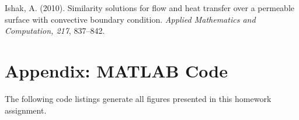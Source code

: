 \documentclass[12pt]{article}
\begin{document}
Ishak, A. (2010). Similarity solutions for flow and heat transfer over a permeable surface with convective boundary condition. \textit{Applied Mathematics and Computation, 217}, 837--842.

\section*{Appendix: MATLAB Code} %

The following code listings generate all figures presented in this homework assignment.


\end{document}
